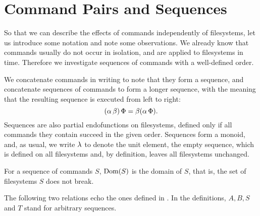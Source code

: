 

\section{Command Pairs and Sequences}


So that we can describe the effects of commands independently of filesystems,
let us introduce some notation
and note some observations.
We already know that
commands usually do not occur in isolation,
and are applied to filesystems in time.
Therefore we investigate sequences of commands with a well-defined order.
\begin{mydef}
We concatenate commands in writing to note that they form a sequence,
and concatenate sequences of commands to form a longer sequence,
with the meaning that the resulting sequence is executed from left to right:
\[ (\alpha\,\beta)\,\Phi = \beta(\alpha\,\Phi). \]
Sequences are also partial endofunctions on filesystems,
defined only if all commands they contain succeed in the given order.
Sequences form a monoid, and, as usual,
we write $\lambda$ to denote the unit element, the empty sequence,
which is defined on all filesystems and, by definition, leaves all filesystems unchanged.
\end{mydef}

\begin{mydef}[$\Dom{S}$]
For a sequence of commands $S$, $\Dom{S}$ is the domain of $S$, that is,
the set of filesystems $S$ does not break.
\end{mydef}


The following two relations 
echo the ones defined in \cite{NREC}.
In the definitions, $A,B,S$ and $T$ stand for arbitrary sequences.

